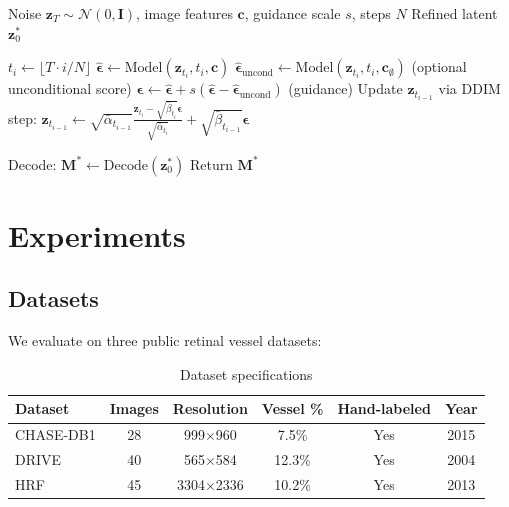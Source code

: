 \documentclass[11pt]{article}
\begin{document}
\begin{algorithm}[H]
\caption{DDIM Sampling with Classifier-Free Guidance}
\label{alg:ddim}
\begin{algorithmic}[1]
\Require Noise $\mathbf{z}_T \sim \mathcal{N}(0,\mathbf{I})$, image features $\mathbf{c}$, guidance scale $s$, steps $N$
\Ensure Refined latent $\mathbf{z}_0^*$

    \State $t_i \gets \lfloor T \cdot i / N \rfloor$
    \State $\hat{\boldsymbol{\epsilon}} \gets \text{Model}(\mathbf{z}_{t_i}, t_i, \mathbf{c})$
    \State $\hat{\boldsymbol{\epsilon}}_{\text{uncond}} \gets \text{Model}(\mathbf{z}_{t_i}, t_i, \mathbf{c}_{\emptyset})$ \quad (optional unconditional score)
    \State $\boldsymbol{\epsilon} \gets \hat{\boldsymbol{\epsilon}} + s(\hat{\boldsymbol{\epsilon}} - \hat{\boldsymbol{\epsilon}}_{\text{uncond}})$ \quad (guidance)
    \State Update $\mathbf{z}_{t_{i-1}}$ via DDIM step: $\mathbf{z}_{t_{i-1}} \gets \sqrt{\bar{\alpha}_{t_{i-1}}} \frac{\mathbf{z}_{t_i} - \sqrt{\bar{\beta}_{t_i}} \boldsymbol{\epsilon}}{\sqrt{\bar{\alpha}_{t_i}}} + \sqrt{\bar{\beta}_{t_{i-1}}} \boldsymbol{\epsilon}$
\EndFor

\State Decode: $\mathbf{M}^* \gets \text{Decode}(\mathbf{z}_0^*)$
\State Return $\mathbf{M}^*$
\end{algorithmic}
\end{algorithm}

\section{Experiments}
\label{sec:experiments}

\subsection{Datasets}

We evaluate on three public retinal vessel datasets:

\begin{table}[H]
\centering
\caption{Dataset specifications}
\begin{tabular}{lccccc}
\toprule
Dataset & Images & Resolution & Vessel \% & Hand-labeled & Year \\
\midrule
CHASE-DB1 & 28 & 999$\times$960 & 7.5\% & Yes & 2015 \\
DRIVE & 40 & 565$\times$584 & 12.3\% & Yes & 2004 \\
HRF & 45 & 3304$\times$2336 & 10.2\% & Yes & 2013 \\
\bottomrule
\end{tabular}
\label{tab:datasets}
\end{table}
\end{document}
